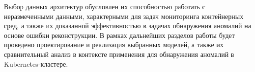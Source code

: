 Выбор данных архитектур обусловлен их способностью работать с неразмеченными данными, характерными для задач мониторинга контейнерных сред, а также их доказанной эффективностью в задачах обнаружения аномалий на основе ошибки реконструкции. В рамках дальнейших разделов работы будет проведено проектирование и реализация выбранных моделей, а также их сравнительный анализ в контексте применения для обнаружения аномалий в Kubernetes-кластере.